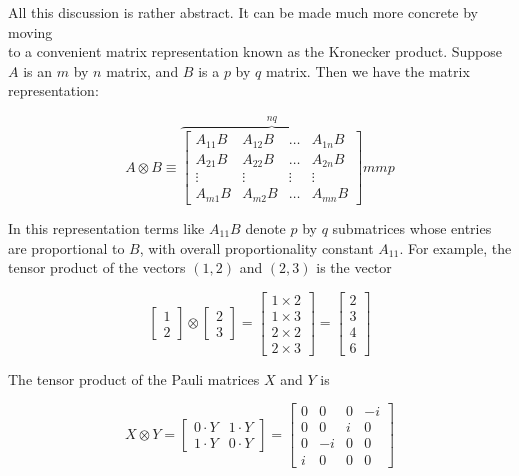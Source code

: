 All this discussion is rather abstract. It can be made much more concrete by moving\\
to a convenient matrix representation known as the Kronecker product. Suppose $A$ is an $m$ by $n$ matrix, and $B$ is a $p$ by $q$ matrix. Then we have the matrix representation:

$$
A \otimes B \equiv \overbrace{\left[\begin{array}{cccc}
A_{11} B & A_{12} B & \ldots & A_{1 n} B \\
A_{21} B & A_{22} B & \ldots & A_{2 n} B \\
\vdots & \vdots & \vdots & \vdots \\
A_{m 1} B & A_{m 2} B & \ldots & A_{m n} B
\end{array}\right]}^{n q} m m p
$$

In this representation terms like $A_{11} B$ denote $p$ by $q$ submatrices whose entries are proportional to $B$, with overall proportionality constant $A_{11}$. For example, the tensor product of the vectors $(1,2)$ and $(2,3)$ is the vector

$$
\left[\begin{array}{l}
1 \\
2
\end{array}\right] \otimes\left[\begin{array}{l}
2 \\
3
\end{array}\right]=\left[\begin{array}{l}
1 \times 2 \\
1 \times 3 \\
2 \times 2 \\
2 \times 3
\end{array}\right]=\left[\begin{array}{l}
2 \\
3 \\
4 \\
6
\end{array}\right]
$$

The tensor product of the Pauli matrices $X$ and $Y$ is

$$
X \otimes Y=\left[\begin{array}{cc}
0 \cdot Y & 1 \cdot Y \\
1 \cdot Y & 0 \cdot Y
\end{array}\right]=\left[\begin{array}{cccc}
0 & 0 & 0 & -i \\
0 & 0 & i & 0 \\
0 & -i & 0 & 0 \\
i & 0 & 0 & 0
\end{array}\right]
$$

